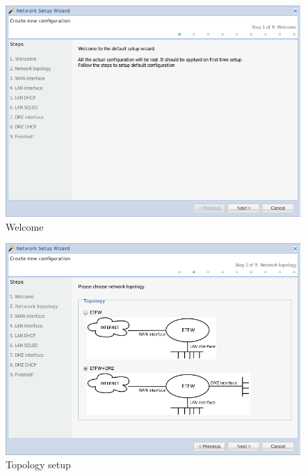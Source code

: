 \begin{figure}[H]
    \begin{center}
    \includegraphics[scale=0.38]{screenshots/etfw/etfw_wizard_01.png}
    \caption{Welcome}
    \label{fig:etfw_wizard_passo1}
    \end{center}
\end{figure}

\begin{figure}[H]
    \begin{center}
    \includegraphics[scale=0.38]{screenshots/etfw/etfw_wizard_02.png}
    \caption{Topology setup}
    \label{fig:etfw_wizard_passo2}
    \end{center}
\end{figure}

